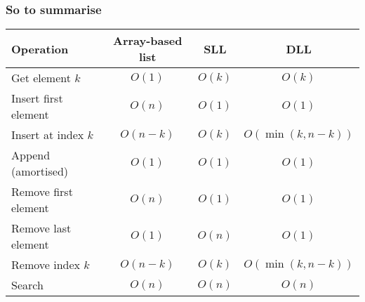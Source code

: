 \begin{frame}
	\frametitle{So to summarise}

	\begin{tabular}{l | c | c | c}
	Operation & Array-based list & SLL & DLL \\	
	\midrule
	Get element $k$ & $O(1)$ &$O(k)$ & $O(k)$ \\
	
	Insert first element& $O(n)$ & $O(1)$ & $O(1)$\\
	Insert at index $k$& $O(n-k)$ & $O(k)$ & $O(\min(k,n-k))$\\
	Append (amortised)& $O(1)$ & $O(1)$ & $O(1)$\\
	
	Remove first element& $O(n)$ & $O(1)$ & $O(1)$\\
	Remove last element& $O(1)$ & $O(n)$ & $O(1)$\\
	Remove index $k$& $O(n-k)$ & $O(k)$ & $O(\min(k,n-k))$\\
	
	Search & $O(n)$ & $O(n)$ & $O(n)$\\
	\end{tabular}


\end{frame}

